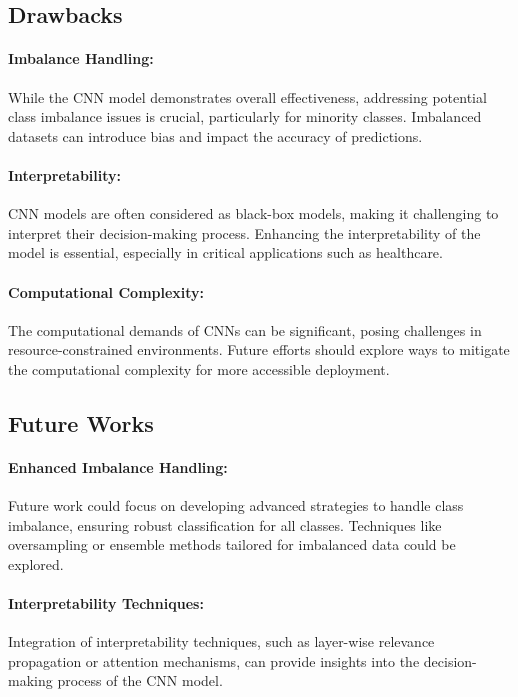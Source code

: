 \documentclass[]{acmsiggraph}
\begin{document}
\subsection{Drawbacks}

\paragraph{Imbalance Handling:}While the CNN model demonstrates overall effectiveness, addressing potential class imbalance issues is crucial, particularly for minority classes. Imbalanced datasets can introduce bias and impact the accuracy of predictions.

\paragraph{Interpretability:}CNN models are often considered as black-box models, making it challenging to interpret their decision-making process. Enhancing the interpretability of the model is essential, especially in critical applications such as healthcare.

\paragraph{Computational Complexity:}The computational demands of CNNs can be significant, posing challenges in resource-constrained environments. Future efforts should explore ways to mitigate the computational complexity for more accessible deployment.

\subsection{Future Works}

\paragraph{Enhanced Imbalance Handling:}Future work could focus on developing advanced strategies to handle class imbalance, ensuring robust classification for all classes. Techniques like oversampling or ensemble methods tailored for imbalanced data could be explored.

\paragraph{Interpretability Techniques:}Integration of interpretability techniques, such as layer-wise relevance propagation or attention mechanisms, can provide insights into the decision-making process of the CNN model.
\end{document}
